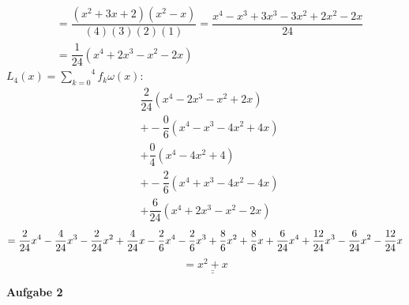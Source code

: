 \documentclass[a4paper,10pt]{article}
\begin{document}
\begin{enumerate}[a)]
\begin{align*}
			& = \dfrac{(x^2 + 3x  + 2)(x^2 - x)}{(4)(3)(2)(1)} = \dfrac{x^4 - x^3 + 3x^3 -3x^2 + 2x^2 - 2x}{24}\\
			& = \dfrac{1}{24}(x^4 + 2x^3 - x^2 - 2x)
		\end{align*}
		$L_4(x) = \overset{4}{\underset{k = 0}{\sum}}f_k \omega(x)$:\\
		\begin{align*}
		 & \dfrac{2}{24}(x^4 - 2x^3 -x^2 + 2x)\\
		 & + -\dfrac{0}{6}(x^4 - x^3 - 4x^2 + 4x)\\
		 & + \dfrac{0}{4}(x^4 - 4x^2 + 4)\\
		 & + -\dfrac{2}{6}(x^4 + x^3 - 4x^2 - 4x)\\
		 & + \dfrac{6}{24}(x^4 + 2x^3 - x^2 - 2x)
		 \end{align*}
		 \[
		 = \dfrac{2}{24}x^4 - \dfrac{4}{24}x^3 - \dfrac{2}{24}x^2 + \dfrac{4}{24}x - \dfrac{2}{6}x^4 - \dfrac{2}{6}x^3 + \dfrac{8}{6}x^2 + \dfrac{8}{6}x + \dfrac{6}{24}x^4 + \dfrac{12}{24}x^3 - \dfrac{6}{24}x^2 - \dfrac{12}{24}x\\
		 \]
		 \[
		 = \underline{\underline{x^2 + x}}
		 \]
	\end{enumerate}
	\newpage
	\textbf{Aufgabe 2}\\
\end{document}
